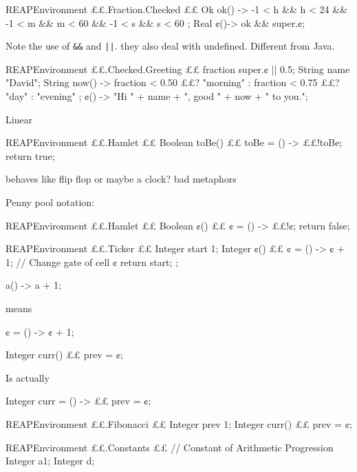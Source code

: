 \begin{Code}{REAP}{Environment }
££.Fraction.Checked {££
 Ok ok() ->
   -1 < h && h < 24 &&
   -1 < m && m < 60 &&
   -1 < s && s < 60 ;
 Real ¢()-> ok && super.¢;
}
\end{Code}

Note the use of \verb+&&+ and \verb+||+. they also deal with undefined.
Different from Java.
\begin{Code}{REAP}{Environment }
££.Checked.Greeting {££
  fraction super.¢ || 0.5;
  String name "David";
  String now() ->
      fraction < 0.50 ££? "morning" :
      fraction < 0.75 ££? "day" :
      "evening"
  ;
  ¢() -> "Hi " + name + ", good " + now + " to you.";
}
\end{Code}

Linear
\begin{Code}{REAP}{Environment }
££.Hamlet {££
  Boolean toBe() {££
    toBe = () -> ££!toBe;
    return true;
  }
}
\end{Code}
behaves like flip flop or maybe a clock? bad metaphors

Penny pool notation:
\begin{Code}{REAP}{Environment }
££.Hamlet {££
  Boolean ¢() {££ ¢ = () -> ££!¢; return false; }
}
\end{Code}

\begin{Code}{REAP}{Environment }
££.Ticker {££
  Integer start 1;
  Integer ¢() {££
      ¢ = () -> ¢ + 1; // Change gate of cell ¢
      return start;
  };
}
\end{Code}

\begin{java}
   a() -> a + 1;
\end{java}
    means
\begin{java}
  ¢ = () -> ¢ + 1;
\end{java}

\begin{java}
  Integer curr() {££ prev = ¢;}
\end{java}
Is actually
\begin{java}
  Integer curr = () -> {££ prev = ¢;}
\end{java}

\begin{Code}{REAP}{Environment }
££.Fibonacci {££
  Integer prev 1;
  Integer curr() {££ prev = ¢;}
}
\end{Code}

\begin{Code}{REAP}{Environment }
££.Constants {££ // Constant of Arithmetic Progression
  Integer a1;
  Integer d;
}
\end{Code}

